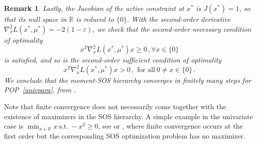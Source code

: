 \documentclass[a4paper,12pt]{article}
\newcommand{\R}{\mathbb{R}} %
\newtheorem{remark}{Remark}
\newcommand{\victor}[1]{{\color{blue} #1}}
\newcommand{\adrien}[1]{{\color{magenta} #1}}
\newcommand{\RR}{\mathbb{R}}
\begin{document}
{\begin{remark}
    Lastly, the Jacobian of the active constraint
    at $x^*$ is $J(x^*) = 1$, so that its null space in $\RR$
    is reduced to $\{0\}$. With the second-order derivative
    $\nabla^2_x L(x^*,\mu^*) = - 2(1-\varepsilon)$,
    we check that the second-order necessary condition of optimality
    \begin{equation*}
        x^T \nabla^2_x L(x^*,\mu^*) x \geq 0 \, , \forall x \in \{0\}
    \end{equation*}
    is satisfied, and so is the second-order sufficient condition of optimality
    \begin{equation*}
        x^T \nabla^2_x L(x^*,\mu^*) x > 0 \,,   \text{ for all} \ 0 \neq x \in \{0\}  \,.
    \end{equation*}
    We conclude that the moment-SOS hierarchy converges in finitely
    many steps for POP~\eqref{univpara}, from \cite[Theorem 1.1]{nie2014optimality}.    
\end{remark}
%
Note that finite convergence does not necessarily come together with the existence of maximizers in the SOS hierarchy. 
A simple example in the univariate case is $\min_{x \in \R} x \:\mathrm{s.t.}\: -x^2 \geq 0$, see \cite[Ex. 1.3.4]{b22} or \cite[\S 2.5.2]{n23}, where finite convergence occurs at the first order but the corresponding SOS optimization problem has no maximizer. }
\end{document}
